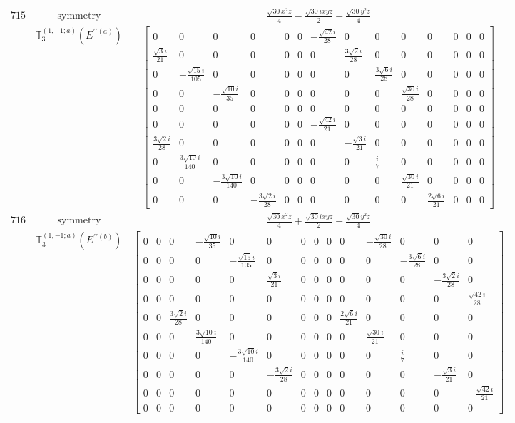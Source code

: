 \documentclass[fleqn,8pt,landscape]{jsarticle}
\begin{document}
\begin{longtable}{ccc}
$ 715 $ & $ \text{symmetry} $ & $ \frac{\sqrt{30} x^{2} z}{4} - \frac{\sqrt{30} i x y z}{2} - \frac{\sqrt{30} y^{2} z}{4} $ \\
$  $ & $ \mathbb{T}_{3}^{(1,-1;a)}(E^{\prime\prime(a)}) $ & $ \begin{bmatrix} 0 & 0 & 0 & 0 & 0 & 0 & - \frac{\sqrt{42} i}{28} & 0 & 0 & 0 & 0 & 0 & 0 & 0 \\ \frac{\sqrt{3} i}{21} & 0 & 0 & 0 & 0 & 0 & 0 & \frac{3 \sqrt{2} i}{28} & 0 & 0 & 0 & 0 & 0 & 0 \\ 0 & - \frac{\sqrt{15} i}{105} & 0 & 0 & 0 & 0 & 0 & 0 & \frac{3 \sqrt{6} i}{28} & 0 & 0 & 0 & 0 & 0 \\ 0 & 0 & - \frac{\sqrt{10} i}{35} & 0 & 0 & 0 & 0 & 0 & 0 & \frac{\sqrt{30} i}{28} & 0 & 0 & 0 & 0 \\ 0 & 0 & 0 & 0 & 0 & 0 & 0 & 0 & 0 & 0 & 0 & 0 & 0 & 0 \\ 0 & 0 & 0 & 0 & 0 & 0 & - \frac{\sqrt{42} i}{21} & 0 & 0 & 0 & 0 & 0 & 0 & 0 \\ \frac{3 \sqrt{2} i}{28} & 0 & 0 & 0 & 0 & 0 & 0 & - \frac{\sqrt{3} i}{21} & 0 & 0 & 0 & 0 & 0 & 0 \\ 0 & \frac{3 \sqrt{10} i}{140} & 0 & 0 & 0 & 0 & 0 & 0 & \frac{i}{7} & 0 & 0 & 0 & 0 & 0 \\ 0 & 0 & - \frac{3 \sqrt{10} i}{140} & 0 & 0 & 0 & 0 & 0 & 0 & \frac{\sqrt{30} i}{21} & 0 & 0 & 0 & 0 \\ 0 & 0 & 0 & - \frac{3 \sqrt{2} i}{28} & 0 & 0 & 0 & 0 & 0 & 0 & \frac{2 \sqrt{6} i}{21} & 0 & 0 & 0 \end{bmatrix} $ \\ \hline
$ 716 $ & $ \text{symmetry} $ & $ \frac{\sqrt{30} x^{2} z}{4} + \frac{\sqrt{30} i x y z}{2} - \frac{\sqrt{30} y^{2} z}{4} $ \\
$  $ & $ \mathbb{T}_{3}^{(1,-1;a)}(E^{\prime\prime(b)}) $ & $ \begin{bmatrix} 0 & 0 & 0 & - \frac{\sqrt{10} i}{35} & 0 & 0 & 0 & 0 & 0 & 0 & - \frac{\sqrt{30} i}{28} & 0 & 0 & 0 \\ 0 & 0 & 0 & 0 & - \frac{\sqrt{15} i}{105} & 0 & 0 & 0 & 0 & 0 & 0 & - \frac{3 \sqrt{6} i}{28} & 0 & 0 \\ 0 & 0 & 0 & 0 & 0 & \frac{\sqrt{3} i}{21} & 0 & 0 & 0 & 0 & 0 & 0 & - \frac{3 \sqrt{2} i}{28} & 0 \\ 0 & 0 & 0 & 0 & 0 & 0 & 0 & 0 & 0 & 0 & 0 & 0 & 0 & \frac{\sqrt{42} i}{28} \\ 0 & 0 & \frac{3 \sqrt{2} i}{28} & 0 & 0 & 0 & 0 & 0 & 0 & \frac{2 \sqrt{6} i}{21} & 0 & 0 & 0 & 0 \\ 0 & 0 & 0 & \frac{3 \sqrt{10} i}{140} & 0 & 0 & 0 & 0 & 0 & 0 & \frac{\sqrt{30} i}{21} & 0 & 0 & 0 \\ 0 & 0 & 0 & 0 & - \frac{3 \sqrt{10} i}{140} & 0 & 0 & 0 & 0 & 0 & 0 & \frac{i}{7} & 0 & 0 \\ 0 & 0 & 0 & 0 & 0 & - \frac{3 \sqrt{2} i}{28} & 0 & 0 & 0 & 0 & 0 & 0 & - \frac{\sqrt{3} i}{21} & 0 \\ 0 & 0 & 0 & 0 & 0 & 0 & 0 & 0 & 0 & 0 & 0 & 0 & 0 & - \frac{\sqrt{42} i}{21} \\ 0 & 0 & 0 & 0 & 0 & 0 & 0 & 0 & 0 & 0 & 0 & 0 & 0 & 0 \end{bmatrix} $ \\ \hline

\end{longtable}
\end{document}
